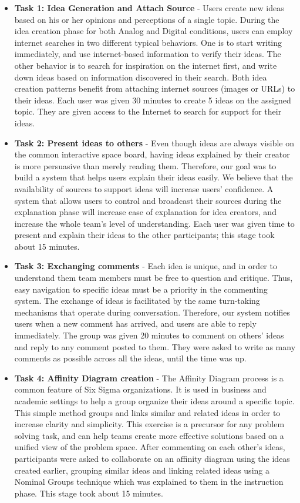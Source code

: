 \documentclass{sigchi}
\begin{document}
\begin{itemize}
\item \textbf{Task 1: Idea Generation and Attach Source} - Users create new ideas based on his or her opinions and perceptions of a single topic. During the idea creation phase for both Analog and Digital conditions, users can employ internet searches in two different typical behaviors. One is to start writing immediately, and use internet-based information to verify their ideas. The other behavior is to search for inspiration on the internet first, and write down ideas based on information discovered in their search. Both idea creation patterns benefit from attaching internet sources (images or URLs) to their ideas. Each user was given 30 minutes to create 5 ideas on the assigned topic. They are given access to the Internet to search for support for their ideas. 
\item \textbf{Task 2: Present ideas to others } - Even though ideas are always visible on the common interactive space board, having ideas explained by their creator is more persuasive than merely reading them. Therefore, our goal was to build a system that helps users explain their ideas easily. We believe that the availability of sources to support ideas will increase users' confidence. A system that allows users to control and broadcast their sources during the explanation phase will increase ease of explanation for idea creators, and increase the whole team's level of understanding. Each user was given time to present and explain their ideas to the other participants; this stage took about 15 minutes. 
\item \textbf{Task 3: Exchanging comments } - Each idea is unique, and in order to understand them team members must be free to question and critique. Thus, easy navigation to specific ideas must be a priority in the commenting system. The exchange of ideas is facilitated by the same turn-taking mechanisms that operate during conversation. Therefore, our system notifies users when a new comment has arrived, and users are able to reply immediately. The group was given 20 minutes to comment on others' ideas and reply to any comment posted to them. They were asked to write as many comments as possible across all the ideas, until the time was up. 
\item \textbf{Task 4: Affinity Diagram creation} - The Affinity Diagram process is a common feature of Six Sigma organizations. It is used in business and academic settings to help a group organize their ideas around a specific topic. This simple method groups and links similar and related ideas in order to increase clarity and simplicity. This exercise is a precursor for any problem solving task, and can help teams create more effective solutions based on a unified view of the problem space.  After commenting on each other's ideas, participants were asked to collaborate on an affinity diagram using the ideas created earlier, grouping similar ideas and linking related ideas using a Nominal Groups technique which was explained to them in the instruction phase. This stage took about 15 minutes.
\end{itemize}
\end{document}
